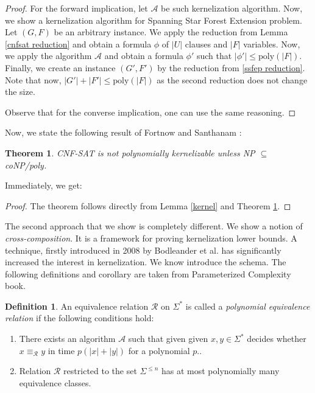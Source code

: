 \documentclass[en]{pracamgr}
\newtheorem{theorem}{Theorem}
\theoremstyle{definition}
\newtheorem{definition}{Definition}
\newcommand{\ssfep}{{\sc Spanning Star Forest Extension}}
\newcommand{\cnfsat}{{\sc CNF-SAT}}
\begin{document}
\begin{proof}
	For the forward implication, let $\mathcal{A}$ be such kernelization algorithm. Now, we show a kernelization algorithm for \ssfep{} problem. Let $(G,F)$ be an arbitrary instance. We apply the reduction from Lemma \ref{cnfsat reduction} and obtain a formula $\phi$ of $|U|$ clauses and $|F|$ variables. Now, we apply the algorithm $\mathcal{A}$ and obtain a formula $\phi'$ such that $|\phi'| \leq \textrm{poly}(|F|)$. Finally, we create an instance $(G',F')$ by the reduction from \ref{ssfep reduction}. Note that now, $|G'|+|F'| \leq \textrm{poly}(|F|)$ as the second reduction does not change the size.
	
	Observe that for the converse implication, one can use the same reasoning.
\end{proof}

Now, we state the following result of Fortnow and Santhanam \cite{CNFSAT}:

\begin{theorem}\label{Fortnow}
	\cnfsat{} is not polynomially kernelizable unless NP $\subseteq$ coNP/poly.
\end{theorem}

Immediately, we get:

\thmssfepnokernel*

\begin{proof}
	The theorem follows directly from Lemma \ref{kernel} and Theorem \ref{Fortnow}.
\end{proof}

The second approach that we show is completely different. We show a notion of \textit{cross-composition}. It is a framework for proving kernelization lower bounds. A technique, firstly introduced in 2008 by Bodleander et al. \cite{Bodlaender} has significantly increased the interest in kernelization. We know introduce the schema. The following definitions and corollary are taken from Parameterized Complexity \cite{ParAlg} book.

\begin{definition}\label{polynomial equivalence relation}
	An equivalence relation $\mathcal{R}$ on $\Sigma^*$ is called a \textit{polynomial equivalence relation} if the following conditions hold:
	\begin{enumerate}
		\item There exists an algorithm $\mathcal{A}$ such that given given $x,y \in \Sigma^*$ decides whether $x \equiv_{\mathcal{R}} y$ in time $p(|x|+|y|)$ for a polynomial $p$..
		\item Relation $\mathcal{R}$ restricted to the set $\Sigma^{\leq n}$ has at most polynomially many equivalence classes.
	\end{enumerate}
\end{definition}
\end{document}

